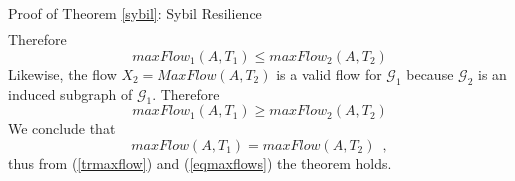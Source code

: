 \begin{sepproof}{Proof of Theorem \ref{sybil}: Sybil Resilience}
\begin{align*}
  \end{align*}
  Therefore
  \begin{equation*}
    maxFlow_1\left(A, T_1\right) \leq maxFlow_2\left(A, T_2\right)
  \end{equation*}
  Likewise, the flow $X_2 = MaxFlow(A, T_2)$ is a valid flow for $\mathcal{G}_1$ because $\mathcal{G}_2$ is an induced
  subgraph of $\mathcal{G}_1$. Therefore
  \begin{equation*}
    maxFlow_1\left(A, T_1\right) \geq maxFlow_2\left(A, T_2\right)
  \end{equation*}
  We conclude that
  \begin{equation}
  \label{eqmaxflows}
    maxFlow\left(A, T_1\right) = maxFlow\left(A, T_2\right) \enspace,
  \end{equation}
  thus from (\ref{trmaxflow}) and (\ref{eqmaxflows}) the theorem holds.
\end{sepproof}
